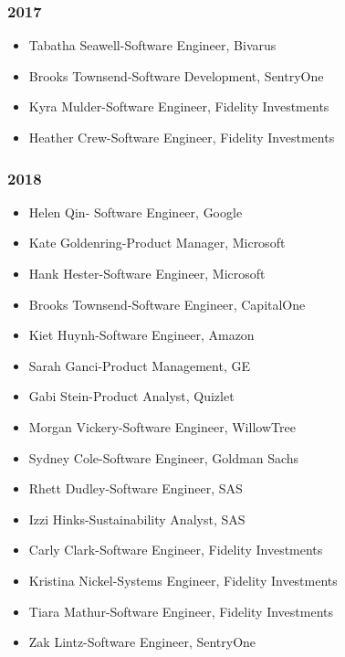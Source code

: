\documentclass[a4paper]{article}
\begin{document}
\subsubsection{2017}
\begin{itemize}
\item Tabatha Seawell-Software Engineer, Bivarus
\item Brooks Townsend-Software Development, SentryOne
\item Kyra Mulder-Software Engineer, Fidelity Investments
\item Heather Crew-Software Engineer, Fidelity Investments
\end{itemize}
\subsubsection{2018}
\begin{itemize}
\item Helen Qin- Software Engineer, Google 
\item Kate Goldenring-Product Manager, Microsoft 
\item Hank Hester-Software Engineer, Microsoft
\item Brooks Townsend-Software Engineer, CapitalOne 
\item Kiet Huynh-Software Engineer, Amazon 
\item Sarah Ganci-Product Management, GE 
\item Gabi Stein-Product Analyst, Quizlet 
\item Morgan Vickery-Software Engineer, WillowTree 
\item Sydney Cole-Software Engineer, Goldman Sachs 
\item Rhett Dudley-Software Engineer, SAS 
\item Izzi Hinks-Sustainability Analyst, SAS
\item Carly Clark-Software Engineer, Fidelity Investments 
\item Kristina Nickel-Systems Engineer, Fidelity Investments
\item Tiara Mathur-Software Engineer, Fidelity Investments
\item Zak Lintz-Software Engineer, SentryOne
\end{itemize}
\end{document}
